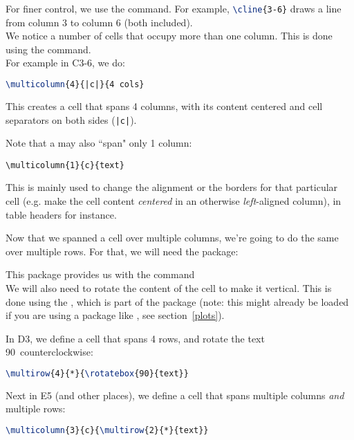 For finer control, we use the  command. For example, \lstinline[language=tex]|\cline{3-6}| draws a line from column 3 to column 6 (both included). \\


We notice a number of cells that occupy more than one column.
This is done using the  command. \\

For example in C3-6, we do:
\begin{lstlisting}[language=tex]
\multicolumn{4}{|c|}{4 cols}
\end{lstlisting}
This creates a cell that spans 4 columns, with its content centered and cell separators on both sides (\texttt{|c|}).

\begin{note}
	Note that a  may also ``span" only 1 column:
	\begin{center}
		\texttt{\textbackslash multicolumn\{1\}\{c\}\{text\}}
	\end{center}
	This is mainly used to change the alignment or the borders for that particular cell (e.g. make the cell content \emph{centered} in an otherwise \emph{left}-aligned column), in table headers for instance.
\end{note}

Now that we spanned a cell over multiple columns, we're going to do the same over multiple rows. For that, we will need the  package:


This package provides us with the  command \\

We will also need to rotate the content of the cell to make it vertical. This is done using the , which is part of the  package (note: this might already be loaded if you are using a package like , see section~\ref{plots}).


In D3, we define a cell that spans 4 rows, and rotate the text 90\textdegree\ counterclockwise:

\begin{lstlisting}[language=tex]
\multirow{4}{*}{\rotatebox{90}{text}}
\end{lstlisting}

Next in E5 (and other places), we define a cell that spans multiple columns \emph{and} multiple rows:
\begin{lstlisting}[language=tex]
\multicolumn{3}{c}{\multirow{2}{*}{text}}
\end{lstlisting}

